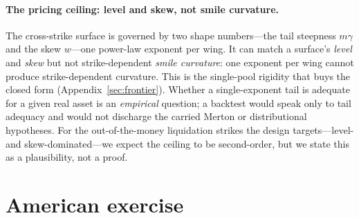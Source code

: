 \documentclass[runningheads]{llncs}
\begin{document}
\paragraph{The pricing ceiling: level and skew, not smile curvature.}
The cross-strike surface is governed by two shape numbers---the tail steepness
$m\gamma$ and the skew $w$---one power-law exponent per wing. It can match a
surface's \emph{level} and \emph{skew} but not strike-dependent \emph{smile
curvature}: one exponent per wing cannot produce strike-dependent curvature. This is
the single-pool rigidity that buys the closed form (Appendix~\ref{sec:frontier}).
Whether a single-exponent tail is adequate for a given real asset is an
\emph{empirical} question; a backtest would speak only to tail adequacy and would
not discharge the carried Merton or distributional hypotheses. For the
out-of-the-money liquidation strikes the design targets---level- and
skew-dominated---we expect the ceiling to be second-order, but we state this as a
plausibility, not a proof.

\section{American exercise}\label{sec:american}
\end{document}
